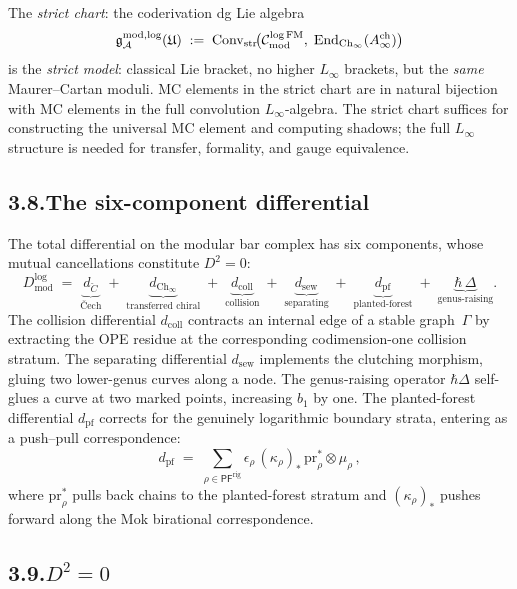 The \emph{strict chart}: the coderivation dg Lie algebra
\[
\mathfrak g^{\mathrm{mod},\log}_{\mathcal{A}}(\mathfrak U)
\;:=\;
\mathrm{Conv}_{\mathrm{str}}\!\bigl(
\mathcal{C}^{\log\mathrm{FM}}_{\mathrm{mod}},\;
\mathrm{End}_{\mathrm{Ch}_\infty}(A^{\mathrm{ch}}_\infty)
\bigr)
\]
is the \emph{strict model}: classical Lie bracket, no higher
$L_\infty$ brackets, but the \emph{same} Maurer--Cartan moduli.
MC elements in the strict chart are in natural bijection with MC
elements in the full convolution $L_\infty$-algebra. The strict
chart suffices for constructing the universal MC element and
computing shadows; the full $L_\infty$ structure is needed for
transfer, formality, and gauge equivalence.

\subsection*{3.8.\enspace The six-component differential}

The total differential on the modular bar complex has six
components, whose mutual cancellations constitute $D^2=0$:
\[
D^{\log}_{\mathrm{mod}}
\;=\;
\underbrace{d_{\check C}}_{\text{\v Cech}}
\;+\;
\underbrace{d_{\mathrm{Ch}_\infty}}_{\text{transferred chiral}}
\;+\;
\underbrace{d_{\mathrm{coll}}}_{\text{collision}}
\;+\;
\underbrace{d_{\mathrm{sew}}}_{\text{separating}}
\;+\;
\underbrace{d_{\mathrm{pf}}}_{\text{planted-forest}}
\;+\;
\underbrace{\hbar\,\Delta}_{\text{genus-raising}}.
\]
The collision differential $d_{\mathrm{coll}}$ contracts an internal
edge of a stable graph~$\Gamma$ by extracting the OPE residue at
the corresponding codimension-one collision stratum. The separating
differential $d_{\mathrm{sew}}$ implements the clutching morphism,
gluing two lower-genus curves along a node. The genus-raising
operator $\hbar\Delta$ self-glues a curve at two marked points,
increasing $b_1$ by one. The planted-forest differential
$d_{\mathrm{pf}}$ corrects for the genuinely logarithmic boundary
strata, entering as a push--pull correspondence:
\[
d_{\mathrm{pf}}
\;=\;
\sum_{\rho\in\mathsf{PF}^{\mathrm{rig}}}
\epsilon_\rho\,
(\kappa_\rho)_*\,\mathrm{pr}_\rho^*\otimes\mu_\rho\,,
\]
where $\mathrm{pr}_\rho^*$ pulls back chains to the planted-forest
stratum and $(\kappa_\rho)_*$ pushes forward along the Mok
birational correspondence.

\subsection*{3.9.\enspace $D^2=0$}

